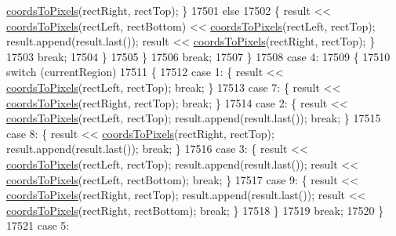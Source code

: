 \begin{DoxyCode}
      \hyperlink{class_q_c_p_abstract_plottable_ade710a776104b14c1c835168ce1bfc5c}{coordsToPixels}(rectRight, rectTop); \}
17501           \textcolor{keywordflow}{else}
17502           \{ result << \hyperlink{class_q_c_p_abstract_plottable_ade710a776104b14c1c835168ce1bfc5c}{coordsToPixels}(rectLeft, rectBottom) << 
      \hyperlink{class_q_c_p_abstract_plottable_ade710a776104b14c1c835168ce1bfc5c}{coordsToPixels}(rectLeft, rectTop); result.append(result.last()); result << 
      \hyperlink{class_q_c_p_abstract_plottable_ade710a776104b14c1c835168ce1bfc5c}{coordsToPixels}(rectRight, rectTop); \}
17503           \textcolor{keywordflow}{break};
17504         \}
17505       \}
17506       \textcolor{keywordflow}{break};
17507     \}
17508     \textcolor{keywordflow}{case} 4:
17509     \{
17510       \textcolor{keywordflow}{switch} (currentRegion)
17511       \{
17512         \textcolor{keywordflow}{case} 1: \{ result << \hyperlink{class_q_c_p_abstract_plottable_ade710a776104b14c1c835168ce1bfc5c}{coordsToPixels}(rectLeft, rectTop); \textcolor{keywordflow}{break}; \}
17513         \textcolor{keywordflow}{case} 7: \{ result << \hyperlink{class_q_c_p_abstract_plottable_ade710a776104b14c1c835168ce1bfc5c}{coordsToPixels}(rectRight, rectTop); \textcolor{keywordflow}{break}; \}
17514         \textcolor{keywordflow}{case} 2: \{ result << \hyperlink{class_q_c_p_abstract_plottable_ade710a776104b14c1c835168ce1bfc5c}{coordsToPixels}(rectLeft, rectTop); result.append(result.last()); \textcolor{keywordflow}{
      break}; \}
17515         \textcolor{keywordflow}{case} 8: \{ result << \hyperlink{class_q_c_p_abstract_plottable_ade710a776104b14c1c835168ce1bfc5c}{coordsToPixels}(rectRight, rectTop); result.append(result.last());
       \textcolor{keywordflow}{break}; \}
17516         \textcolor{keywordflow}{case} 3: \{ result << \hyperlink{class_q_c_p_abstract_plottable_ade710a776104b14c1c835168ce1bfc5c}{coordsToPixels}(rectLeft, rectTop); result.append(result.last()); 
      result << \hyperlink{class_q_c_p_abstract_plottable_ade710a776104b14c1c835168ce1bfc5c}{coordsToPixels}(rectLeft, rectBottom); \textcolor{keywordflow}{break}; \}
17517         \textcolor{keywordflow}{case} 9: \{ result << \hyperlink{class_q_c_p_abstract_plottable_ade710a776104b14c1c835168ce1bfc5c}{coordsToPixels}(rectRight, rectTop); result.append(result.last());
       result << \hyperlink{class_q_c_p_abstract_plottable_ade710a776104b14c1c835168ce1bfc5c}{coordsToPixels}(rectRight, rectBottom); \textcolor{keywordflow}{break}; \}
17518       \}
17519       \textcolor{keywordflow}{break};
17520     \}
17521     \textcolor{keywordflow}{case} 5:

\end{DoxyCode}
